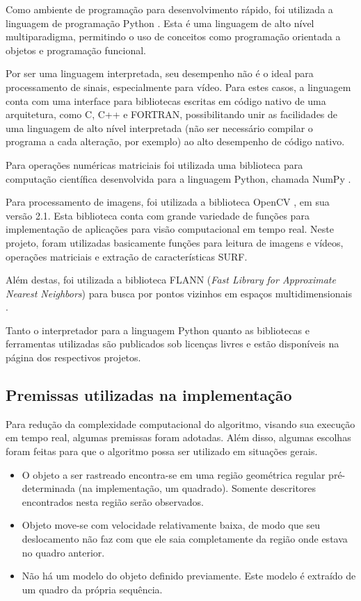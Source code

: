 \documentclass[a4paper]{coursepaper-br}
\begin{document}
Como ambiente de programação para desenvolvimento rápido, foi
utilizada a linguagem de programação Python \cite{python}. Esta é uma
linguagem de alto nível multiparadigma, permitindo o uso de conceitos
como programação orientada a objetos e programação funcional.

Por ser uma linguagem interpretada, seu desempenho não é o ideal para
processamento de sinais, especialmente para vídeo. Para estes casos, a
linguagem conta com uma interface para bibliotecas escritas em código
nativo de uma arquitetura, como C, C++ e FORTRAN, possibilitando unir
as facilidades de uma linguagem de alto nível interpretada (não ser
necessário compilar o programa a cada alteração, por exemplo) ao alto
desempenho de código nativo.

Para operações numéricas matriciais foi utilizada uma biblioteca para
computação científica desenvolvida para a linguagem Python, chamada
NumPy \cite{numpy}.

Para processamento de imagens, foi utilizada a biblioteca OpenCV
\cite{opencv}, em sua versão 2.1. Esta biblioteca conta com grande
variedade de funções para implementação de aplicações para visão
computacional em tempo real. Neste projeto, foram utilizadas
basicamente funções para leitura de imagens e vídeos, operações
matriciais e extração de características SURF.

Além destas, foi utilizada a biblioteca FLANN (\emph{Fast Library for
  Approximate Nearest Neighbors}) para busca por pontos vizinhos em
espaços multidimensionais \cite{flann}.

Tanto o interpretador para a linguagem Python quanto as bibliotecas e
ferramentas utilizadas são publicados sob licenças livres e estão
disponíveis na página dos respectivos projetos.

\subsection{Premissas utilizadas na implementação}

Para redução da complexidade computacional do algoritmo, visando sua
execução em tempo real, algumas premissas foram adotadas. Além disso,
algumas escolhas foram feitas para que o algoritmo possa ser utilizado
em situações gerais.

\begin{itemize}
 \item O objeto a ser rastreado encontra-se em uma região geométrica
   regular pré-determinada (na implementação, um quadrado). Somente
   descritores encontrados nesta região serão observados.
 \item Objeto move-se com velocidade relativamente baixa, de modo
   que seu deslocamento não faz com que ele saia completamente da
   região onde estava no quadro anterior.
 \item Não há um modelo do objeto definido previamente. Este modelo é
   extraído de um quadro da própria sequência.
\end{itemize}
\end{document}

